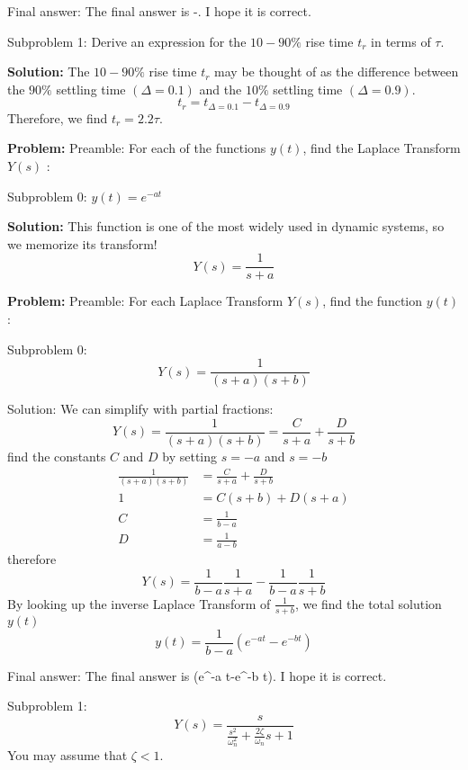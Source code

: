 \documentclass[10pt]{article}
\begin{document}
Final answer: The final answer is -\tau \ln \Delta. I hope it is correct.

Subproblem 1: Derive an expression for the \(10-90 \%\) rise time \(t_{r}\) in terms of $\tau$.


\textbf{Solution:}
The \(10-90 \%\) rise time \(t_{r}\) may be thought of as the difference between the \(90 \%\) settling time \((\Delta=0.1)\) and the \(10 \%\) settling time \((\Delta=0.9)\).
\[
t_{r}=t_{\Delta=0.1}-t_{\Delta=0.9}
\]
Therefore, we find \(t_{r}=\boxed{2.2 \tau}\).


\textbf{Problem:}
Preamble: For each of the functions $y(t)$, find the Laplace Transform $Y(s)$ :

Subproblem 0: $y(t)=e^{-a t}$


\textbf{Solution:}
This function is one of the most widely used in dynamic systems, so we memorize its transform!
\[
Y(s)=\boxed{\frac{1}{s+a}}
\]


\textbf{Problem:}
Preamble: For each Laplace Transform \(Y(s)\), find the function \(y(t)\) :

Subproblem 0: \[
Y(s)=\boxed{\frac{1}{(s+a)(s+b)}}
\]


Solution: We can simplify with partial fractions:
\[
Y(s)=\frac{1}{(s+a)(s+b)}=\frac{C}{s+a}+\frac{D}{s+b}
\]
find the constants \(C\) and \(D\) by setting \(s=-a\) and \(s=-b\)
\[
\begin{aligned}
\frac{1}{(s+a)(s+b)} &=\frac{C}{s+a}+\frac{D}{s+b} \\
1 &=C(s+b)+D(s+a) \\
C &=\frac{1}{b-a} \\
D &=\frac{1}{a-b}
\end{aligned}
\]
therefore
\[
Y(s)=\frac{1}{b-a} \frac{1}{s+a}-\frac{1}{b-a} \frac{1}{s+b}
\]
By looking up the inverse Laplace Transform of \(\frac{1}{s+b}\), we find the total solution \(y(t)\)
\[
y(t)=\boxed{\frac{1}{b-a}\left(e^{-a t}-e^{-b t}\right)}
\]

Final answer: The final answer is \left(e^{-a t}-e^{-b t}\right). I hope it is correct.

Subproblem 1: \[
Y(s)=\frac{s}{\frac{s^{2}}{\omega_{n}^{2}}+\frac{2 \zeta}{\omega_{n}} s+1}
\]
You may assume that $\zeta < 1$.
\end{document}
